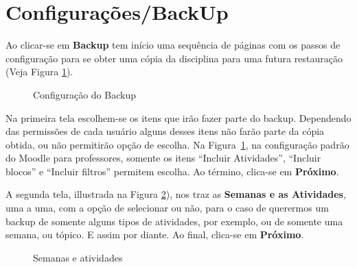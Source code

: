 \section{Configurações/BackUp}
Ao clicar-se em \textbf{Backup} tem início uma sequência de páginas com os passos de configuração para se obter uma cópia da disciplina para uma futura restauração (Veja Figura \ref{Fig: confBackup}).

\begin{figure}[htbp]
 \begin{center}
  \caption{Configuração do Backup}
  \label{Fig: confBackup}
 \end{center}
\end{figure}

Na primeira tela escolhem-se os itens que irão fazer parte do backup. Dependendo das permissões de cada usuário alguns desses itens não farão parte da cópia obtida, ou não permitirão opção de escolha. Na Figura~\ref{Fig: confBackup}, na configuração padrão do Moodle para professores, somente os itens “Incluir Atividades”, “Incluir blocos” e “Incluir filtros” permitem escolha. Ao término, clica-se em \textbf{Próximo}.

A segunda tela, illustrada na Figura \ref{Fig: sentAtiv}), nos traz as \textbf{Semanas e as Atividades}, uma a uma, com a opção de selecionar ou não, para o caso de querermos um backup de somente alguns tipos de atividades, por exemplo, ou de somente uma semana, ou tópico. E assim por diante. Ao final, clica-se em \textbf{Próximo}.

\begin{figure}[htbp]
 \begin{center}
  \caption{Semanas e atividades}
  \label{Fig: sentAtiv}
 \end{center}
\end{figure}

